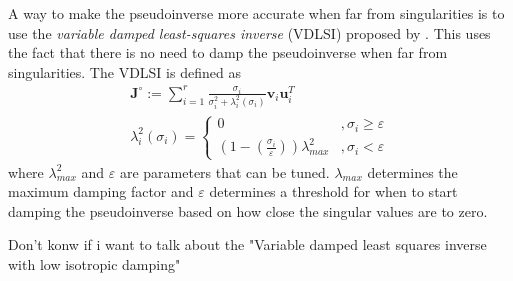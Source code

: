 A way to make the pseudoinverse more accurate when far from singularities is to
use the \emph{variable damped least-squares inverse} (VDLSI) proposed by \cite{chiaverini1997}.
This uses the fact that there is no need to damp the pseudoinverse when far from singularities.
The VDLSI is defined as
\begin{subequations}
\begin{align}
    \bm{J}^{\circ} := \sum_{i=1}^r \frac{\sigma_i}{\sigma_i^2 + \lambda_i^2(\sigma_i)} \bm{v}_i \bm{u}_i^T \\
    \lambda_i^2(\sigma_i) = \begin{cases}
        0 & ,\sigma_i \geq \varepsilon \\
        \left(1-\left(\frac{\sigma_i}{\varepsilon}\right)\right)\lambda_{max}^2 & ,\sigma_i < \varepsilon
    \end{cases}
\end{align}
\end{subequations}
where $\lambda_{max}^2$ and $\varepsilon$ are parameters that can be tuned. $\lambda_{max}$
determines the maximum damping factor and $\varepsilon$ determines a threshold for when
to start damping the pseudoinverse based on how close the singular values are to zero.

{
\color{red}
Don't konw if i want to talk about the "Variable damped least squares inverse with low isotropic damping"
}
